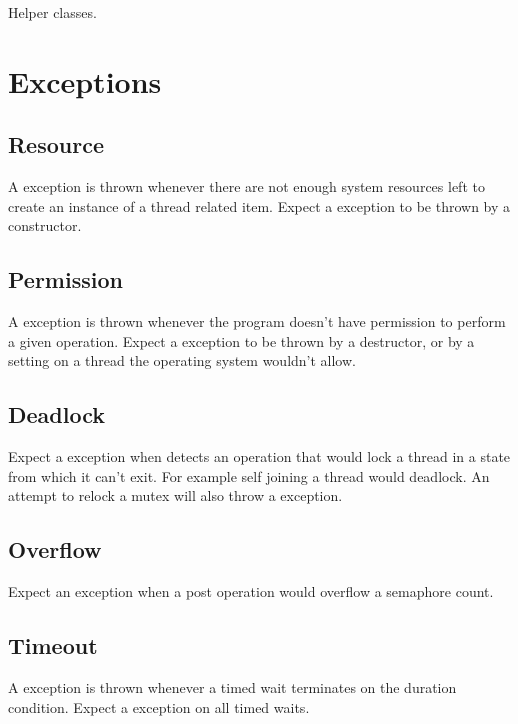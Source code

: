 \manminitoc
\noindent
Helper classes.






\chapter{Exceptions}
\label{cha:Exceptions}

\manminitoc
\noindent

\section{Resource}
\label{sec:Exceptions.Resource}
A  exception is thrown whenever there are not enough system resources left to create an instance of a thread related item.
Expect a  exception to be thrown by a constructor.

\section{Permission}
\label{sec:Exceptions.Permission}
A  exception is thrown whenever the program doesn't have permission to perform a given operation.
Expect a  exception to be thrown by a destructor, or by a setting on a thread the operating system wouldn't allow.

\section{Deadlock}
\label{sec:Exceptions.Deadlock}
Expect a  exception when \lisle detects an operation that would lock a thread in a state from which it can't exit.
For example self joining a thread would deadlock.
An attempt to relock a mutex will also throw a  exception.

\section{Overflow}
\label{sec:Exceptions.Overflow}
Expect an  exception when a post operation would overflow a semaphore count.

\section{Timeout}
\label{sec:Exceptions.Timeout}
A  exception is thrown whenever a timed wait terminates on the duration condition.
Expect a  exception on all timed waits.

